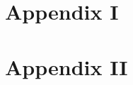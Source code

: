 \documentclass[12pt, english]{article}
\begin{document}
    \newpage
    \begin{appendices}
        \section*{Appendix I}\label{sec:appendix-i}
        
        \section*{Appendix II}\label{sec:appendix-ii}
        
    \end{appendices}


\end{document}
